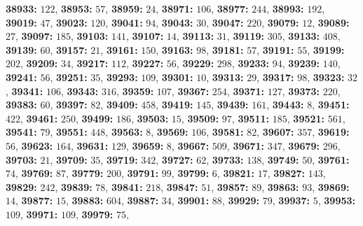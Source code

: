 \textsf{\bfseries 38933:} $122$, \textsf{\bfseries 38953:} $57$, \textsf{\bfseries 38959:} $24$, \textsf{\bfseries 38971:} $106$, \textsf{\bfseries 38977:} $244$, \textsf{\bfseries 38993:} $192$, \textsf{\bfseries 39019:} $47$, \textsf{\bfseries 39023:} $120$, \textsf{\bfseries 39041:} $94$, \textsf{\bfseries 39043:} $30$, \textsf{\bfseries 39047:} $220$, \textsf{\bfseries 39079:} $12$, \textsf{\bfseries 39089:} $27$, \textsf{\bfseries 39097:} $185$, \textsf{\bfseries 39103:} $141$, \textsf{\bfseries 39107:} $14$, \textsf{\bfseries 39113:} $31$, \textsf{\bfseries 39119:} $305$, \textsf{\bfseries 39133:} $408$, \textsf{\bfseries 39139:} $60$, \textsf{\bfseries 39157:} $21$, \textsf{\bfseries 39161:} $150$, \textsf{\bfseries 39163:} $98$, \textsf{\bfseries 39181:} $57$, \textsf{\bfseries 39191:} $55$, \textsf{\bfseries 39199:} $202$, \textsf{\bfseries 39209:} $34$, \textsf{\bfseries 39217:} $112$, \textsf{\bfseries 39227:} $56$, \textsf{\bfseries 39229:} $298$, \textsf{\bfseries 39233:} $94$, \textsf{\bfseries 39239:} $140$, \textsf{\bfseries 39241:} $56$, \textsf{\bfseries 39251:} $35$, \textsf{\bfseries 39293:} $109$, \textsf{\bfseries 39301:} $10$, \textsf{\bfseries 39313:} $29$, \textsf{\bfseries 39317:} $98$, \textsf{\bfseries 39323:} $32$, \textsf{\bfseries 39341:} $106$, \textsf{\bfseries 39343:} $316$, \textsf{\bfseries 39359:} $107$, \textsf{\bfseries 39367:} $254$, \textsf{\bfseries 39371:} $127$, \textsf{\bfseries 39373:} $220$, \textsf{\bfseries 39383:} $60$, \textsf{\bfseries 39397:} $82$, \textsf{\bfseries 39409:} $458$, \textsf{\bfseries 39419:} $145$, \textsf{\bfseries 39439:} $161$, \textsf{\bfseries 39443:} $8$, \textsf{\bfseries 39451:} $422$, \textsf{\bfseries 39461:} $250$, \textsf{\bfseries 39499:} $186$, \textsf{\bfseries 39503:} $15$, \textsf{\bfseries 39509:} $97$, \textsf{\bfseries 39511:} $185$, \textsf{\bfseries 39521:} $561$, \textsf{\bfseries 39541:} $79$, \textsf{\bfseries 39551:} $448$, \textsf{\bfseries 39563:} $8$, \textsf{\bfseries 39569:} $106$, \textsf{\bfseries 39581:} $82$, \textsf{\bfseries 39607:} $357$, \textsf{\bfseries 39619:} $56$, \textsf{\bfseries 39623:} $164$, \textsf{\bfseries 39631:} $129$, \textsf{\bfseries 39659:} $8$, \textsf{\bfseries 39667:} $509$, \textsf{\bfseries 39671:} $347$, \textsf{\bfseries 39679:} $296$, \textsf{\bfseries 39703:} $21$, \textsf{\bfseries 39709:} $35$, \textsf{\bfseries 39719:} $342$, \textsf{\bfseries 39727:} $62$, \textsf{\bfseries 39733:} $138$, \textsf{\bfseries 39749:} $50$, \textsf{\bfseries 39761:} $74$, \textsf{\bfseries 39769:} $87$, \textsf{\bfseries 39779:} $200$, \textsf{\bfseries 39791:} $99$, \textsf{\bfseries 39799:} $6$, \textsf{\bfseries 39821:} $17$, \textsf{\bfseries 39827:} $143$, \textsf{\bfseries 39829:} $242$, \textsf{\bfseries 39839:} $78$, \textsf{\bfseries 39841:} $218$, \textsf{\bfseries 39847:} $51$, \textsf{\bfseries 39857:} $89$, \textsf{\bfseries 39863:} $93$, \textsf{\bfseries 39869:} $14$, \textsf{\bfseries 39877:} $15$, \textsf{\bfseries 39883:} $604$, \textsf{\bfseries 39887:} $34$, \textsf{\bfseries 39901:} $88$, \textsf{\bfseries 39929:} $79$, \textsf{\bfseries 39937:} $5$, \textsf{\bfseries 39953:} $109$, \textsf{\bfseries 39971:} $109$, \textsf{\bfseries 39979:} $75$, 
